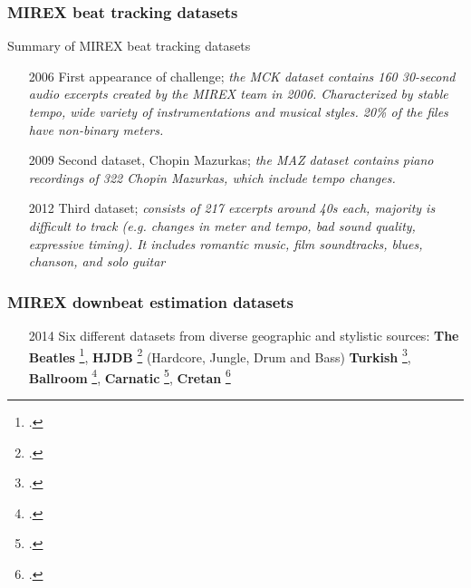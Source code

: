 \documentclass{beamer}
\begin{document}

\begin{frame}
	\frametitle{MIREX beat tracking datasets}
	Summary of MIREX beat tracking datasets
	\begin{enumerate}
		\item[2006]
			First appearance of challenge; \textit{the MCK dataset contains 160 30-second audio excerpts created by the MIREX team in 2006. Characterized by stable tempo, wide variety of instrumentations and musical styles. 20\% of the files have non-binary meters.}
		\item[2009]
			Second dataset, Chopin Mazurkas; \textit{the MAZ dataset contains piano recordings of 322 Chopin Mazurkas, which include tempo changes.}
		\item[2012]
			Third dataset; \textit{consists of 217 excerpts around 40s each, majority is difficult to track (e.g. changes in meter and tempo, bad sound quality, expressive timing). It includes romantic music, film soundtracks, blues, chanson, and solo guitar}
	\end{enumerate}
\end{frame}


\begin{frame}
	\frametitle{MIREX downbeat estimation datasets}
	\begin{enumerate}
		\item[2014]
			Six different datasets from diverse geographic and stylistic sources:
			\textbf{The Beatles} \footcite{beatles}, \textbf{HJDB} \footcite{hjdb} (Hardcore, Jungle, Drum and Bass)
			\textbf{Turkish} \footcite{turkish}, \textbf{Ballroom} \footcite{ballroom},
			\textbf{Carnatic} \footcite{carnatic}, \textbf{Cretan} \footcite{cretan}
	\end{enumerate}
\end{frame}
\end{document}
